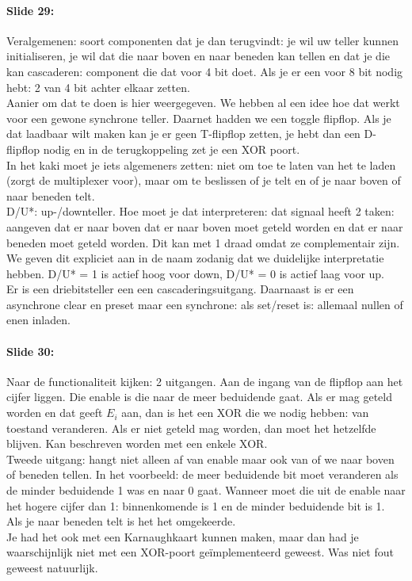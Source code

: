 \documentclass[10pt,a4paper]{book}
\begin{document}
\paragraph{Slide 29:} Veralgemenen: soort componenten dat je dan terugvindt: je wil uw teller kunnen initialiseren, je wil dat die naar boven en naar beneden kan tellen en dat je die kan cascaderen: component die dat voor 4 bit doet. Als je er een voor 8 bit nodig hebt: 2 van 4 bit achter elkaar zetten.\\
Aanier om dat te doen is hier weergegeven. We hebben al een idee hoe dat werkt voor een gewone synchrone teller. Daarnet hadden we een toggle flipflop. Als je dat laadbaar wilt maken kan je er geen T-flipflop zetten, je hebt dan een D-flipflop nodig en in de terugkoppeling zet je een XOR poort.\\
In het kaki moet je iets algemeners zetten: niet om toe te laten van het te laden (zorgt de multiplexer voor), maar om te beslissen of je telt en of je naar boven of naar beneden telt.\\
D/U*: up-/downteller. Hoe moet je dat interpreteren: dat signaal heeft 2 taken: aangeven dat er naar boven dat er naar boven moet geteld worden en dat er naar beneden moet geteld worden. Dit kan met 1 draad omdat ze complementair zijn. We geven dit expliciet aan in de naam zodanig dat we duidelijke interpretatie hebben. D/U* = 1 is actief hoog voor down, D/U* = 0 is actief laag voor up.\\
Er is een driebitsteller een een cascaderingsuitgang. Daarnaast is er een asynchrone clear en preset maar een synchrone: als set/reset is: allemaal nullen of enen inladen.

\paragraph{Slide 30:} Naar de functionaliteit kijken: 2 uitgangen. Aan de ingang van de flipflop aan het cijfer liggen. Die enable is die naar de meer beduidende gaat. Als er mag geteld worden en dat geeft $E_i$ aan, dan is het een XOR die we nodig hebben: van toestand veranderen. Als er niet geteld mag worden, dan moet het hetzelfde blijven. Kan beschreven worden met een enkele XOR.\\
Tweede uitgang: hangt niet alleen af van enable maar ook van of we naar boven of beneden tellen. In het voorbeeld: de meer beduidende bit moet veranderen als de minder beduidende 1 was en naar 0 gaat. Wanneer moet die uit de enable naar het hogere cijfer dan 1: binnenkomende is 1 en de minder beduidende bit is 1.\\
Als je naar beneden telt is het het omgekeerde.\\
Je had het ook met een Karnaughkaart kunnen maken, maar dan had je waarschijnlijk niet met een XOR-poort ge\"implementeerd geweest. Was niet fout geweest natuurlijk.
\end{document}
